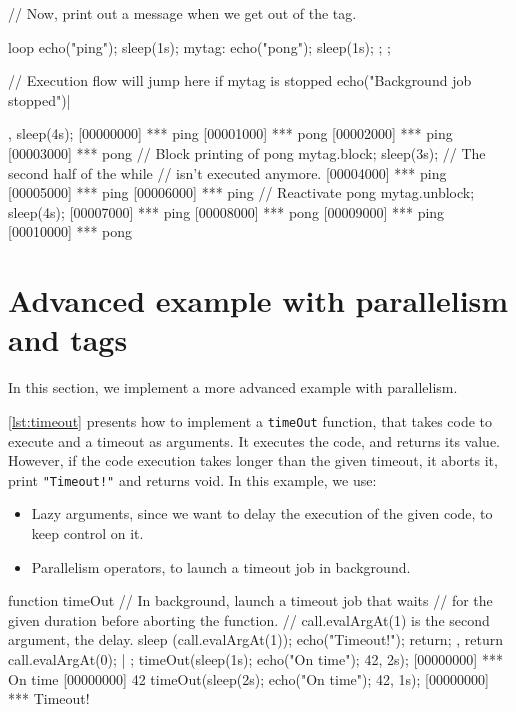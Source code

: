 \documentclass[openright,twoside,12pt]{report}
\begin{document}
\begin{urbiscript}[caption=Blocking chunks of code, label=lst:block]
// Now, print out a message when we get out of the tag.
{
  loop
  {
    echo("ping"); sleep(1s);
    mytag: { echo("pong"); sleep(1s); };
  };

  // Execution flow will jump here if mytag is stopped
  echo("Background job stopped")|
},
sleep(4s);
[00000000] *** ping
[00001000] *** pong
[00002000] *** ping
[00003000] *** pong
// Block printing of pong
mytag.block;
sleep(3s);
// The second half of the while
// isn't executed anymore.
[00004000] *** ping
[00005000] *** ping
[00006000] *** ping
// Reactivate pong
mytag.unblock;
sleep(4s);
[00007000] *** ping
[00008000] *** pong
[00009000] *** ping
[00010000] *** pong
\end{urbiscript}

\section{Advanced example with parallelism and tags}

In this section, we implement a more advanced example with
parallelism.

\autoref{lst:timeout} presents how to implement a \texttt{timeOut}
function, that takes code to execute and a timeout as arguments. It
executes the code, and returns its value. However, if the code
execution takes longer than the given timeout, it aborts it, print
\lstinline|"Timeout!"| and returns void. In this example, we use:

\begin{itemize}
\item Lazy arguments, since we want to delay the execution of the
  given code, to keep control on it.
\item Parallelism operators, to launch a timeout job in background.
\end{itemize}

\begin{urbiscript}[caption=Implementing a timeout method, label=lst:timeout]
function timeOut
{
  // In background, launch a timeout job that waits
  // for the given duration before aborting the function.
  // call.evalArgAt(1) is the second argument, the delay.
  {
    sleep (call.evalArgAt(1));
    echo("Timeout!");
    return;
  },
  return call.evalArgAt(0);
} | {};
timeOut({sleep(1s); echo("On time"); 42}, 2s);
[00000000] *** On time
[00000000] 42
timeOut({sleep(2s); echo("On time"); 42}, 1s);
[00000000] *** Timeout!
\end{urbiscript}
\end{document}

